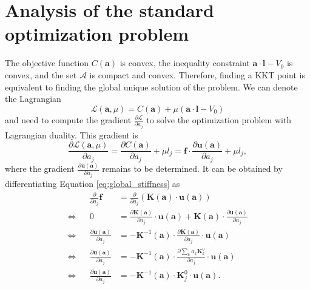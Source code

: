 \section{Analysis of the standard optimization problem}
The objective function $C(\mathbf{a})$ is convex, the inequality constraint $\mathbf{a} \cdot \mathbf{l} - V_0$ is convex, and the set $\mathcal{A}$ is compact and convex. Therefore, finding a KKT point is equivalent to finding the global unique solution of the problem. We can denote the Lagrangian 
\begin{equation}
    \mathcal{L}(\mathbf{a}, \mu) = C(\mathbf{a}) + \mu \left( \mathbf{a} \cdot \mathbf{l} - V_0 \right) 
\end{equation}
and need to compute the gradient $\frac{\partial \mathcal{L}}{\partial a_j}$ to solve the optimization problem with Lagrangian duality. This gradient is 
\begin{equation}
    \frac{\partial \mathcal{L} (\mathbf{a}, \mu)}{\partial a_j} 
    = \frac{\partial C (\mathbf{a})}{\partial a_j} + \mu l_j
    = \mathbf{f} \cdot \frac{\partial \mathbf{u} (\mathbf{a})}{\partial a_j} + \mu l_j,
    \label{eq:lagrange_truss_problem}
\end{equation}
where the gradient $\frac{\partial \mathbf{u} (\mathbf{a})}{\partial a_j}$ remains to be determined. It can be obtained by differentiating Equation \eqref{eq:global_stiffness} as
\begin{align}
        && \frac{\partial}{\partial a_j} \mathbf{f} &= \frac{\partial}{\partial a_j} \left( \mathbf{K} (\mathbf{a}) \cdot \mathbf{u} (\mathbf{a}) \right) \\
        \Leftrightarrow &&
        0 &= \frac{\partial \mathbf{K} (\mathbf{a})}{\partial a_j} \cdot \mathbf{u} (\mathbf{a}) + \mathbf{K} (\mathbf{a}) \cdot \frac{\partial \mathbf{u} (\mathbf{a})}{\partial a_j} \\
        \Leftrightarrow &&
        \frac{\partial \mathbf{u} (\mathbf{a})}{\partial a_j} &= - \mathbf{K}^{-1}(\mathbf{a}) \cdot \frac{\partial \mathbf{K} (\mathbf{a})}{\partial a_j}  \cdot \mathbf{u} (\mathbf{a}) \\
        \Leftrightarrow &&
        \frac{\partial \mathbf{u} (\mathbf{a})}{\partial a_j} &= - \mathbf{K}^{-1}(\mathbf{a}) \cdot \frac{\partial \sum_k a_k\mathbf{K}^0_k}{\partial a_j}  \cdot \mathbf{u} (\mathbf{a}) \\
        \Leftrightarrow &&
        \frac{\partial \mathbf{u} (\mathbf{a})}{\partial a_j} &= - \mathbf{K}^{-1}(\mathbf{a}) \cdot \mathbf{K}^0_j \cdot \mathbf{u} (\mathbf{a}).
\end{align}
